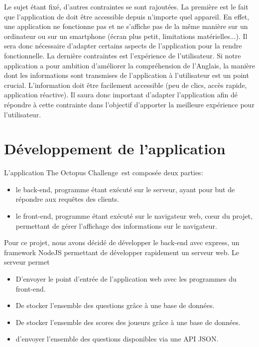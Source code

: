 \documentclass[a4paper,11pt, oneside]{book}
\def\appName{The Octopus Challenge}
\begin{document}
Le sujet étant fixé, d'autres contraintes se sont rajoutées. La première est le fait que l'application de doit être accessible depuis n'importe quel appareil. En effet,
une application ne fonctionne pas et ne s'affiche pas de la même manière sur un ordinateur ou sur un smartphone (écran plus petit, limitations matérielles...). Il sera donc nécessaire
d'adapter certains aspects de l'application pour la rendre fonctionnelle. La dernière contraintes est l'expérience de l'utilisateur. Si notre application a pour ambition d'améliorer
la compréhension de l'Anglais, la manière dont les informations sont transmises de l'application à l'utilisateur est un point crucial. L'information doit être facilement accessible (peu de clics, accès rapide, application réactive).
Il saura donc important d'adapter l'application afin dé répondre à cette contrainte dans l'objectif d'apporter la meilleure expérience pour l'utilisateur.

\section{Développement de l'application}

L'application \appName \ est composée deux parties:
\begin{itemize}
	\item le back-end, programme étant exécuté sur le serveur, ayant pour but de répondre aux requêtes des clients.
	\item le front-end, programme étant exécuté sur le navigateur web, cœur du projet, permettant de gérer l'affichage des informations sur le navigateur.\\
\end{itemize}


\noindent Pour ce projet, nous avons décidé de développer le back-end avec express, un framework NodeJS permettant de développer rapidement un serveur web. Le serveur permet
\begin{itemize}
	\item D'envoyer le point d'entrée de l'application web avec les programmes du front-end.
	\item De stocker l'ensemble des questions grâce à une base de données.
	\item De stocker l'ensemble des scores des joueurs grâce à une base de données.
	\item d'envoyer l'ensemble des questions disponibles via une API JSON.\\
\end{itemize}
\end{document}
